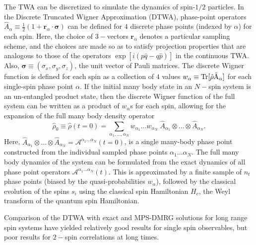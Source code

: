 \documentclass[extendedabs]{bmvc2k}
\begin{document}
The TWA can be discretized to simulate the dynamics of spin-$1/2$ particles. In the Discrete Truncated Wigner Approximation (DTWA), phase-point operators $\hat{A}_\alpha\equiv \frac{1}{2}(1+\bm{r}_\alpha\cdot\bm{\sigma})$ can be defined for $4$ discrete phase points (indexed by $\alpha$) for each spin. Here, the choice of $3-$vectors $\bm{r}_\alpha$ denotes a particular sampling scheme, and the choices are made so as to satisfy projection properties that are analogous to those of the operators $\exp{\left[i\left(p\hat{q}-q\hat{p}\right)\right]}$ in the continuous TWA. Also, $\bm{\sigma}\equiv(\sigma_x, \sigma_y,\sigma_z)$, the unit vector of Pauli matrices. The discrete Wigner function is defined for each spin as a collection of $4$ values  $w_\alpha\equiv \rm{Tr}[\hat{\rho} \hat{A}_{\alpha}]$ for each single-spin phase point $\alpha$. If the initial many body state in an $N-$spin system is an un-entangled product state, then the discrete Wigner function of the full system can be written as a product of $w_\alpha$s for each spin, allowing for the expansion of the full many body density operator
\begin{equation}
\hat{\rho}_0\equiv \hat{\rho}(t=0) = \displaystyle\sum_{\alpha_1,\dots,\alpha_N} w_{\alpha_1}\dots w_{\alpha_N}\; \hat{A}_{\alpha_1}\otimes \dots \otimes \hat{A}_{\alpha_N}.
\end{equation}
Here, $\hat{A}_{\alpha_1}\otimes \dots \otimes \hat{A}_{\alpha_N} = \mathcal{A}^{\alpha_1\dots\alpha_N}(t=0)$, is a single many-body phase point constructed from the individual sampled phase points $\alpha_1\dots\alpha_N$. The full many body dynamics of the system can be formulated from the exact dynamics of all phase point operators $\mathcal{A}^{\alpha_1\dots\alpha_N}(t)$. This is approximated by a finite sample of $n_t$ phase points (biased by the quasi-probabilities $w_\alpha$), followed by the classical evolution of the spins $s_i$ using the classical spin Hamiltonian $H_c$, the Weyl transform of the quantum spin Hamiltonian.

Comparison of the DTWA with exact and MPS-DMRG solutions for long range spin systems have yielded relatively good results for single spin observables, but poor results for $2-$spin correlations at long times.


\end{document}
